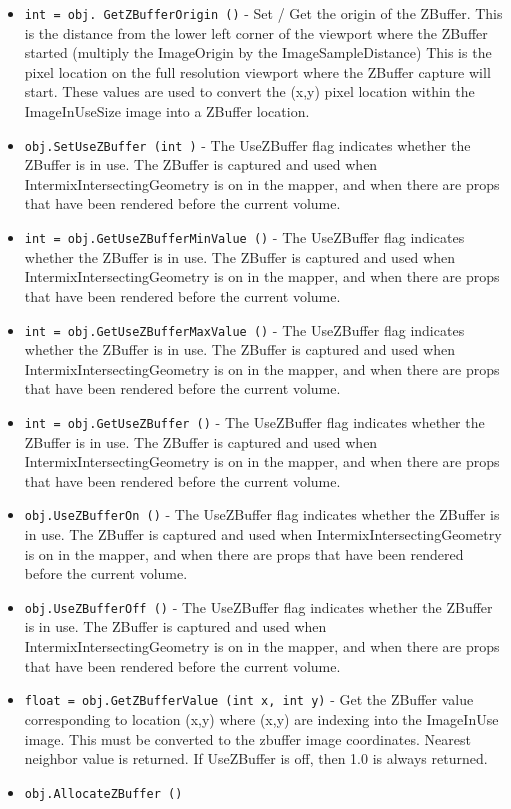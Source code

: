 \begin{itemize}
\item  \verb|int = obj. GetZBufferOrigin ()| -  Set / Get the origin of the ZBuffer. This is the distance
 from the lower left corner of the viewport where the ZBuffer
 started (multiply the ImageOrigin by the ImageSampleDistance)
 This is the pixel location on the full resolution viewport
 where the ZBuffer capture will start. These values are used 
 to convert the (x,y) pixel location within the ImageInUseSize 
 image into a ZBuffer location.

\item  \verb|obj.SetUseZBuffer (int )| -  The UseZBuffer flag indicates whether the ZBuffer is in use.
 The ZBuffer is captured and used when IntermixIntersectingGeometry
 is on in the mapper, and when there are props that have been
 rendered before the current volume. 

\item  \verb|int = obj.GetUseZBufferMinValue ()| -  The UseZBuffer flag indicates whether the ZBuffer is in use.
 The ZBuffer is captured and used when IntermixIntersectingGeometry
 is on in the mapper, and when there are props that have been
 rendered before the current volume. 

\item  \verb|int = obj.GetUseZBufferMaxValue ()| -  The UseZBuffer flag indicates whether the ZBuffer is in use.
 The ZBuffer is captured and used when IntermixIntersectingGeometry
 is on in the mapper, and when there are props that have been
 rendered before the current volume. 

\item  \verb|int = obj.GetUseZBuffer ()| -  The UseZBuffer flag indicates whether the ZBuffer is in use.
 The ZBuffer is captured and used when IntermixIntersectingGeometry
 is on in the mapper, and when there are props that have been
 rendered before the current volume. 

\item  \verb|obj.UseZBufferOn ()| -  The UseZBuffer flag indicates whether the ZBuffer is in use.
 The ZBuffer is captured and used when IntermixIntersectingGeometry
 is on in the mapper, and when there are props that have been
 rendered before the current volume. 

\item  \verb|obj.UseZBufferOff ()| -  The UseZBuffer flag indicates whether the ZBuffer is in use.
 The ZBuffer is captured and used when IntermixIntersectingGeometry
 is on in the mapper, and when there are props that have been
 rendered before the current volume. 

\item  \verb|float = obj.GetZBufferValue (int x, int y)| -  Get the ZBuffer value corresponding to location (x,y) where (x,y)
 are indexing into the ImageInUse image. This must be converted to
 the zbuffer image coordinates. Nearest neighbor value is returned.
 If UseZBuffer is off, then 1.0 is always returned.

\item  \verb|obj.AllocateZBuffer ()|

\end{itemize}
